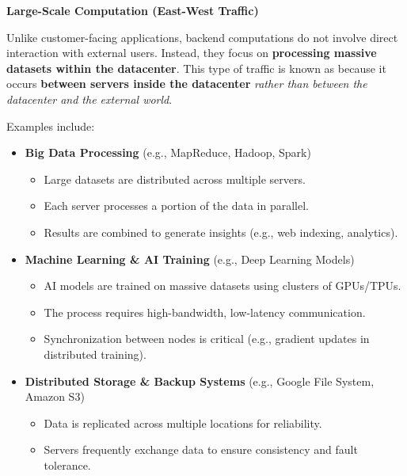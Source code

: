 \highspace
\begin{flushleft}
    \textcolor{Green3}{ \textbf{Large-Scale Computation (East-West Traffic)}}
\end{flushleft}
Unlike customer-facing applications, backend computations do not involve direct interaction with external users. Instead, they focus on \textbf{processing massive datasets within the datacenter}. This type of traffic is known as  because it occurs \textbf{between servers inside the datacenter} \emph{rather than between the datacenter and the external world}.

\begin{examplebox}
    Examples include:
    \begin{itemize}
        \item \textcolor{Green3}{\textbf{Big Data Processing}} (e.g., MapReduce, Hadoop, Spark)
        \begin{itemize}
            \item Large datasets are distributed across multiple servers.
            \item Each server processes a portion of the data in parallel.
            \item Results are combined to generate insights (e.g., web indexing, analytics).
        \end{itemize}
        
        \item \textcolor{Green3}{\textbf{Machine Learning \& AI Training}} (e.g., Deep Learning Models)
        \begin{itemize}
            \item AI models are trained on massive datasets using clusters of GPUs/TPUs.
            \item The process requires high-bandwidth, low-latency communication.
            \item Synchronization between nodes is critical (e.g., gradient updates in distributed training).
        \end{itemize}

        \item \textcolor{Green3}{\textbf{Distributed Storage \& Backup Systems}} (e.g., Google File System, Amazon S3)
        \begin{itemize}
            \item Data is replicated across multiple locations for reliability.
            \item Servers frequently exchange data to ensure consistency and fault tolerance.
        \end{itemize}
    \end{itemize}
\end{examplebox}

